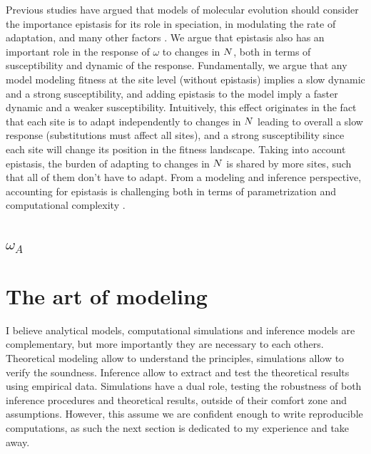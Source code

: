 Previous studies have argued that models of molecular evolution should consider the importance epistasis for its role in speciation, in modulating the rate of adaptation, and many other factors \citep{Goldstein2017, Miller2018}.
We argue that epistasis also has an important role in the response of $\omega$ to changes in $N$, both in terms of susceptibility and dynamic of the response.
Fundamentally, we argue that any model modeling fitness at the site level (without epistasis) implies a slow dynamic and a strong susceptibility, and adding epistasis to the model imply a faster dynamic and a weaker susceptibility.
Intuitively, this effect originates in the fact that each site is to adapt independently to changes in $N$ leading to overall a slow response (substitutions must affect all sites), and a strong susceptibility since each site will change its position in the fitness landscape.
Taking into account epistasis, the burden of adapting to changes in $N$ is shared by more sites, such that all of them don't have to adapt. 
From a modeling and inference perspective, accounting for epistasis is challenging both in terms of parametrization and computational complexity \citep{Rodrigue2005, Manhart2014}. 

\subsection{$\omega_A$}


\section{The art of modeling}
I believe analytical models, computational simulations and inference models are complementary, but more importantly they are necessary to each others. 
Theoretical modeling allow to understand the principles, simulations allow to verify the soundness.
Inference allow to extract and test the theoretical results using empirical data.
Simulations have a dual role, testing the robustness of both inference procedures and theoretical results, outside of their comfort zone and assumptions.
However, this assume we are confident enough to write reproducible computations, as such the next section is dedicated to my experience and take away.

